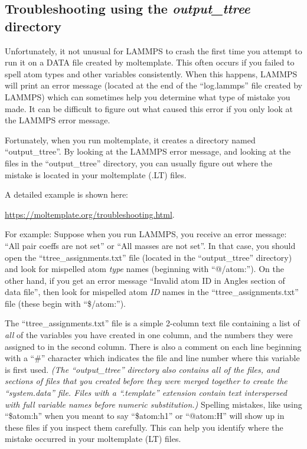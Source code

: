 \documentclass[11pt]{article}
\begin{document}
\subsection{Troubleshooting using the \textit{output\_ttree} directory}
\label{sec:output_ttree}
Unfortunately, it not unusual for LAMMPS to crash the first time you 
attempt to run it on a DATA file created by moltemplate.  This often occurs 
if you failed to spell atom types and other variables consistently.
When this happens, LAMMPS will print an error message
(located at the end of the ``log.lammps'' file created by LAMMPS)
which can sometimes help you determine what type of mistake you made.
It can be difficult to figure out what caused this error if you only
look at the LAMMPS error message.

Fortunately, when you run moltemplate, it creates a directory named
``output\_ttree''. By looking at the LAMMPS error message, and looking
at the files in the ``output\_ttree'' directory, you can usually
figure out where the mistake is located in your moltemplate (.LT) files.

A detailed example is shown here:

\url{https://moltemplate.org/troubleshooting.html}.

For example: Suppose when you run LAMMPS, you receive an error message:
``All pair coeffs are not set'' or ``All masses are not set''.
In that case, you should open the ``ttree\_assignments.txt'' file
(located in the ``output\_ttree'' directory) and look for mispelled
atom \textit{type} names (beginning with ``@/atom:'').
On the other hand, if you get an error message
``Invalid atom ID in Angles section of data file'',
then look for mispelled atom \textit{ID} names in the
``ttree\_assignments.txt'' file (these begin with ``\$/atom:'').

The ``ttree\_assignments.txt'' file is a simple 2-column text file
containing a list of \textit{all} 
of the variables you have created in one column,
and the numbers they were assigned to in the second column.
There is also a comment on each line beginning with a ``\#'' character which
indicates the file and line number where this variable is first used.
\textit{(The ``output\_ttree'' directory also contains all of the files,
and sections of files that you created before they were merged together
to create the ``system.data'' file. Files with a ``.template'' extension
contain text interspersed with full variable names
before numeric substitution.)}
Spelling mistakes, like using ``\$atom:h'' when you meant to say ``\$atom:h1''
or ``@atom:H'' will show up in these files if you inspect them carefully.
This can help you identify where the mistake occurred
in your moltemplate (LT) files.
\end{document}
